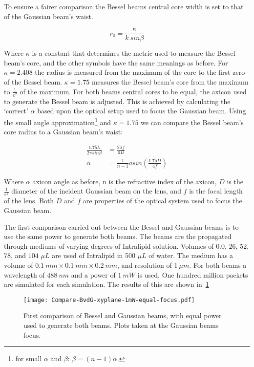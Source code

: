 To ensure a fairer comparison the Bessel beams central core width is set to that of the Gaussian beam's waist.

\begin{equation}
r_0=\frac{\kappa}{k\ sin\beta}  
\end{equation}

Where $\kappa$ is a constant that determines the metric used to measure the Bessel beam's core, and the other symbols have the same meanings as before.
For $\kappa=2.408$ the radius is measured from the maximum of the core to the first zero of the Bessel beam.
$\kappa=1.75$ measures the Bessel beam's core from the maximum to $\tfrac{1}{e^2}$ of the maximum.
For both beams central cores to be equal, the axicon used to generate the Bessel beam is adjusted.
This is achieved by calculating the `correct' $\alpha$ based upon the optical setup used to focus the Gaussian beam. 
Using the small angle approximation\footnote{for small $\alpha$ and $\beta$: $\beta=(n-1)\alpha$.} and $\kappa=1.75$ we can compare the Bessel beam's core radius to a Gaussian beam's waist:

\begin{align}
\frac{1.75\lambda}{2\pi sin\beta}&=\frac{2\lambda f}{\pi D} \\
\alpha &= \frac{1}{n-1}asin\left(\frac{1.75 D}{4 f}\right)
\end{align}

Where $\alpha$ axicon angle as before, n is the refractive index of the axicon, $D$ is the $\tfrac{1}{e^2}$ diameter of the incident Gaussian beam on the lens, and $f$ is the focal length of the lens.
Both $D$ and $f$ are properties of the optical system used to focus the Gaussian beam.

The first comparison carried out between the Bessel and Gaussian beams is to use the same power to generate both beams.
The beams are the propagated through mediums of varying degrees of Intralipid solution.
Volumes of $0.0$, $26$, $52$, $78$, and $104$ $\mu L$ are used of Intralipid in 500 $\mu L$ of water.
The medium has a volume of $0.1~mm \times 0.1~mm \times 0.2~mm$, and resolution of $1~\mu m$.
For both beams a wavelength of $488~nm$ and a power of $1~mW$ is used.
One hundred million packets are simulated for each simulation.
The results of this are shown in~\cref{fig:1stcomp}

\begin{figure}[!ht]
    \centering
    \texttt{[image: Compare-BvdG-xyplane-1mW-equal-focus.pdf]}
    \caption{First comparison of Bessel and Gaussian beams, with equal power used to generate both beams. Plots taken at the Gaussian beams focus.}
    \label{fig:1stcomp}
\end{figure}

